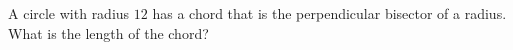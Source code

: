 A circle with radius $12$ has a chord that is the perpendicular bisector of a radius. What is the length of the chord?
